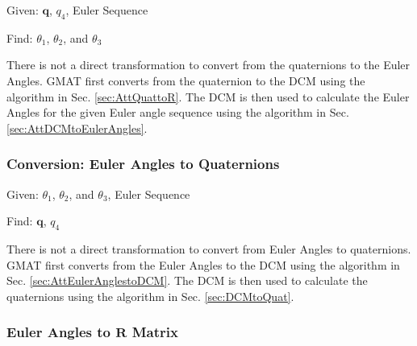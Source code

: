 \noindent Given: $\mathbf{q}$, $q_4$, Euler Sequence

\noindent Find: $\theta_1$, $\theta_2$, and $\theta_3$

There is not a direct transformation to convert from the quaternions
to the Euler Angles.  GMAT first converts from the quaternion to the
DCM using the algorithm in Sec. \ref{sec:AttQuattoR}.  The DCM is
then used to calculate the Euler Angles for the given Euler angle
sequence using the algorithm in Sec. \ref{sec:AttDCMtoEulerAngles}.

\subsubsection{Conversion:  Euler Angles to Quaternions}

\noindent Given: $\theta_1$, $\theta_2$, and $\theta_3$, Euler
Sequence

\noindent Find: $\mathbf{q}$, $q_4$

There is not a direct transformation to convert from Euler Angles to
quaternions.  GMAT first converts from the Euler Angles to the DCM
using the algorithm in Sec. \ref{sec:AttEulerAnglestoDCM}.  The DCM
is then used to calculate the quaternions using the algorithm in
Sec. \ref{sec:DCMtoQuat}.



\subsubsection{Euler Angles to $\mathbf{R}$ Matrix}




